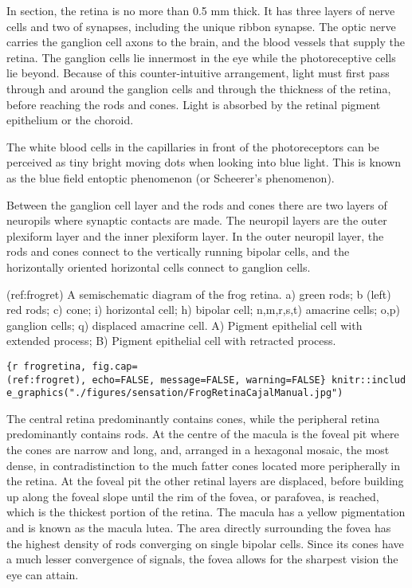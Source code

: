 In section, the retina is no more than 0.5 mm thick. It has three layers
of nerve cells and two of synapses, including the unique ribbon synapse.
The optic nerve carries the ganglion cell axons to the brain, and the
blood vessels that supply the retina. The ganglion cells lie innermost
in the eye while the photoreceptive cells lie beyond. Because of this
counter-intuitive arrangement, light must first pass through and around
the ganglion cells and through the thickness of the retina, before
reaching the rods and cones. Light is absorbed by the retinal pigment
epithelium or the choroid.

The white blood cells in the capillaries in front of the photoreceptors
can be perceived as tiny bright moving dots when looking into blue
light. This is known as the blue field entoptic phenomenon (or
Scheerer's phenomenon).

Between the ganglion cell layer and the rods and cones there are two
layers of neuropils where synaptic contacts are made. The neuropil
layers are the outer plexiform layer and the inner plexiform layer. In
the outer neuropil layer, the rods and cones connect to the vertically
running bipolar cells, and the horizontally oriented horizontal cells
connect to ganglion cells.

(ref:frogret) A semischematic diagram of the frog retina. a) green rods;
b (left) red rods; c) cone; i) horizontal cell; h) bipolar cell;
n,m,r,s,t) amacrine cells; o,p) ganglion cells; q) displaced amacrine
cell. A) Pigment epithelial cell with extended process; B) Pigment
epithelial cell with retracted process.

\texttt{\{r\ frogretina,\ fig.cap=\textquotesingle{}(ref:frogret)\textquotesingle{},\ echo=FALSE,\ message=FALSE,\ warning=FALSE\}\ knitr::include\_graphics("./figures/sensation/FrogRetinaCajalManual.jpg")}

The central retina predominantly contains cones, while the peripheral
retina predominantly contains rods. At the centre of the macula is the
foveal pit where the cones are narrow and long, and, arranged in a
hexagonal mosaic, the most dense, in contradistinction to the much
fatter cones located more peripherally in the retina. At the foveal pit
the other retinal layers are displaced, before building up along the
foveal slope until the rim of the fovea, or parafovea, is reached, which
is the thickest portion of the retina. The macula has a yellow
pigmentation and is known as the macula lutea. The area directly
surrounding the fovea has the highest density of rods converging on
single bipolar cells. Since its cones have a much lesser convergence of
signals, the fovea allows for the sharpest vision the eye can attain.

